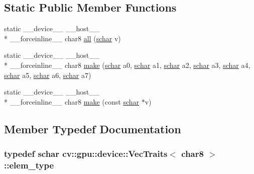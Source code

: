\subsection*{Static Public Member Functions}
\begin{DoxyCompactItemize}
\item 
static \-\_\-\-\_\-device\-\_\-\-\_\- \-\_\-\-\_\-host\-\_\-\-\_\- \\*
\-\_\-\-\_\-forceinline\-\_\-\-\_\- char8 \hyperlink{structcv_1_1gpu_1_1device_1_1VecTraits_3_01char8_01_4_a45be77c48f5a4f712639789501d73f92}{all} (\hyperlink{core_2types__c_8h_a0fd9ce9d735064461bebfe6037026093}{schar} v)
\item 
static \-\_\-\-\_\-device\-\_\-\-\_\- \-\_\-\-\_\-host\-\_\-\-\_\- \\*
\-\_\-\-\_\-forceinline\-\_\-\-\_\- char8 \hyperlink{structcv_1_1gpu_1_1device_1_1VecTraits_3_01char8_01_4_a964c4c16a1dcf3a4ad73ee2346183730}{make} (\hyperlink{core_2types__c_8h_a0fd9ce9d735064461bebfe6037026093}{schar} a0, \hyperlink{core_2types__c_8h_a0fd9ce9d735064461bebfe6037026093}{schar} a1, \hyperlink{core_2types__c_8h_a0fd9ce9d735064461bebfe6037026093}{schar} a2, \hyperlink{core_2types__c_8h_a0fd9ce9d735064461bebfe6037026093}{schar} a3, \hyperlink{core_2types__c_8h_a0fd9ce9d735064461bebfe6037026093}{schar} a4, \hyperlink{core_2types__c_8h_a0fd9ce9d735064461bebfe6037026093}{schar} a5, \hyperlink{core_2types__c_8h_a0fd9ce9d735064461bebfe6037026093}{schar} a6, \hyperlink{core_2types__c_8h_a0fd9ce9d735064461bebfe6037026093}{schar} a7)
\item 
static \-\_\-\-\_\-device\-\_\-\-\_\- \-\_\-\-\_\-host\-\_\-\-\_\- \\*
\-\_\-\-\_\-forceinline\-\_\-\-\_\- char8 \hyperlink{structcv_1_1gpu_1_1device_1_1VecTraits_3_01char8_01_4_acbb9c6f89097976dc9aab2dca8cd0469}{make} (const \hyperlink{core_2types__c_8h_a0fd9ce9d735064461bebfe6037026093}{schar} $\ast$v)
\end{DoxyCompactItemize}


\subsection{Member Typedef Documentation}
\hypertarget{structcv_1_1gpu_1_1device_1_1VecTraits_3_01char8_01_4_a42958b3e5f97f3490675caabaa7faf3c}{
\subsubsection[{elem\-\_\-type}]{\setlength{\rightskip}{0pt plus 5cm}typedef {\bf schar} {\bf cv\-::gpu\-::device\-::\-Vec\-Traits}$<$ char8 $>$\-::{\bf elem\-\_\-type}}}\label{structcv_1_1gpu_1_1device_1_1VecTraits_3_01char8_01_4_a42958b3e5f97f3490675caabaa7faf3c}


